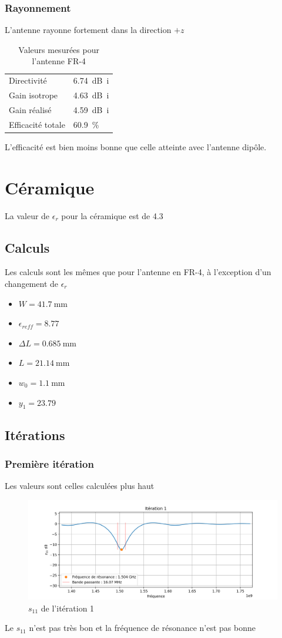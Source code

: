 \documentclass[Deriaz_Traiber_Labo02.tex]{subfiles}
\begin{document}
\subsubsection{Rayonnement}
L'antenne rayonne fortement dans la direction $+z$
\begin{table}[H]
\centering
\begin{tabular}{ll}
Directivité & \SI{6.74}{\deci\bel i}\\
Gain isotrope & \SI{4.63}{\deci\bel i}\\
Gain réalisé & \SI{4.59}{\deci\bel i}\\
Efficacité totale & \SI{60.9}{\percent}
\end{tabular}
\caption{Valeurs mesurées pour l'antenne FR-4}
\end{table}
L'efficacité est bien moins bonne que celle atteinte avec l'antenne dipôle.
\pagebreak
\section{Céramique}
La valeur de $\epsilon_r$ pour la céramique est de 4.3
\subsection{Calculs}
Les calculs sont les mêmes que pour l'antenne en FR-4, à l'exception d'un changement de $\epsilon_r$
\begin{itemize}
\item $W=\SI{41.7}{\milli\meter}$
\item $\epsilon_{reff}=8.77$
\item $\Delta L=\SI{0.685}{\milli\meter}$
\item $L=\SI{21.14}{\milli\meter}$
\item $w_0=\SI{1.1}{\milli\meter}$
\item $y_1=23.79$
\end{itemize}
\subsection{Itérations}
\subsubsection{Première itération}
Les valeurs sont celles calculées plus haut
\begin{figure}[H]
\centering
\includegraphics[width=15cm]{../Calculs/run_id_ceramique_1.png}
\caption[caption]{$s_{11}$ de l'itération 1}
\end{figure}
Le $s_{11}$ n'est pas très bon et la fréquence de résonance n'est pas bonne
\pagebreak
\end{document}
